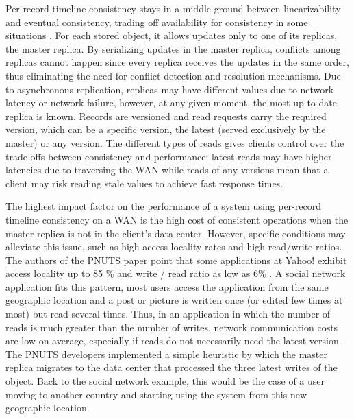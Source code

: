 \documentclass[man,floatsintext,12pt]{apa6}
\begin{document}
Per-record timeline consistency stays in a middle ground between
linearizability \parencite{Herlihy1990} and eventual consistency, trading off
availability for consistency in some situations \parencite{Cooper2008}. For each
stored object, it allows updates only to one of its replicas, the master
replica. By serializing updates in the master replica, conflicts among replicas
cannot happen since every replica receives the updates in the same order, thus
eliminating the need for conflict detection and resolution mechanisms. Due to
asynchronous replication, replicas may have different values due to network
latency or network failure, however, at any given moment, the most up-to-date
replica is known. Records are versioned and read requests carry the required
version, which can be a specific version, the latest (served exclusively by the
master) or any version. The different types of reads gives clients control over
the trade-offs between consistency and performance: latest reads may have higher
latencies due to traversing the WAN while reads of any versions mean that a
client may risk reading stale values to achieve fast response times.

The highest impact factor on the performance of a system using per-record
timeline consistency on a WAN is the high cost of consistent operations when
the master replica is not in the client's data center. However, specific
conditions may alleviate this issue, such as high access locality rates and
high read/write ratios. The authors of the PNUTS paper point that some
applications at Yahoo! exhibit access locality up to 85 \% and write / read
ratio as low as 6\% \parencite{Kadambi2011, Cooper2008}. A social network
application fits this pattern, most users access the application from the same
geographic location and a post or picture is written once (or edited few times
at most) but read several times. Thus, in an application in which the number of
reads is much greater than the number of writes, network communication costs
are low on average, especially if reads do not necessarily need the latest
version. The PNUTS developers implemented a simple heuristic by which the
master replica migrates to the data center that processed the three latest
writes of the object. Back to the social network example, this would be the
case of a user moving to another country and starting using the system from
this new geographic location.
\end{document}
